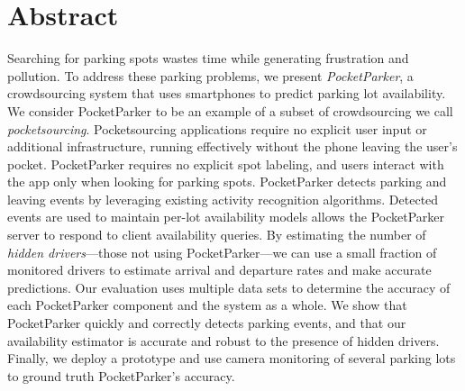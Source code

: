 \section*{Abstract}

Searching for parking spots wastes time while generating frustration and
pollution. To address these parking problems, we present
\textit{PocketParker}, a crowdsourcing system that uses smartphones to
predict parking lot availability. We consider PocketParker to be an example
of a subset of crowdsourcing we call \textit{pocketsourcing}. Pocketsourcing
applications require no explicit user input or additional infrastructure,
running effectively without the phone leaving the user's pocket. PocketParker
requires no explicit spot labeling, and users interact with the app only when
looking for parking spots. PocketParker detects parking and leaving events by
leveraging existing activity recognition algorithms. Detected events are used
to maintain per-lot availability models allows the PocketParker server to
respond to client availability queries. By estimating the number of
\textit{hidden drivers}---those not using PocketParker---we can use a small
fraction of monitored drivers to estimate arrival and departure rates and
make accurate predictions. Our evaluation uses multiple data sets to
determine the accuracy of each PocketParker component and the system as a
whole. We show that PocketParker quickly and correctly detects parking
events, and that our availability estimator is accurate and robust to the
presence of hidden drivers. Finally, we deploy a prototype and use camera
monitoring of several parking lots to ground truth PocketParker's accuracy.
